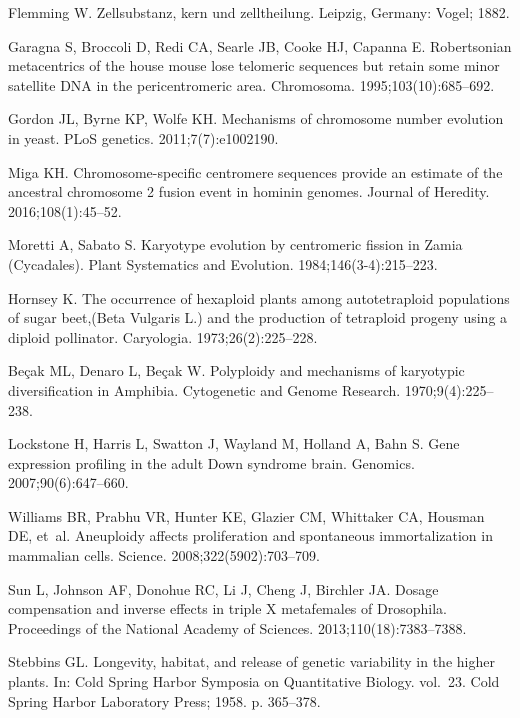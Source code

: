 \documentclass[]{rsos}%
\begin{document}
\begin{thebibliography}{9}

Flemming W. 
Zellsubstanz, kern und zelltheilung. Leipzig, Germany: Vogel; 1882.

Garagna S, Broccoli D, Redi CA, Searle JB, Cooke HJ, Capanna E.
 Robertsonian metacentrics of the house mouse lose telomeric sequences
  but retain some minor satellite DNA in the pericentromeric area.
 Chromosoma. 1995;103(10):685--692.

Gordon JL, Byrne KP, Wolfe KH.
 Mechanisms of chromosome number evolution in yeast.
 PLoS genetics. 2011;7(7):e1002190.

Miga KH.
 Chromosome-specific centromere sequences provide an estimate of the
  ancestral chromosome 2 fusion event in hominin genomes.
 Journal of Heredity. 2016;108(1):45--52.

Moretti A, Sabato S.
 Karyotype evolution by centromeric fission in Zamia (Cycadales).
 Plant Systematics and Evolution. 1984;146(3-4):215--223.

Hornsey K.
 The occurrence of hexaploid plants among autotetraploid populations
  of sugar beet,(Beta Vulgaris L.) and the production of tetraploid progeny
  using a diploid pollinator.
 Caryologia. 1973;26(2):225--228.

Be{\c{c}}ak ML, Denaro L, Be{\c{c}}ak W.
 Polyploidy and mechanisms of karyotypic diversification in Amphibia.
 Cytogenetic and Genome Research. 1970;9(4):225--238.

Lockstone H, Harris L, Swatton J, Wayland M, Holland A, Bahn S.
 Gene expression profiling in the adult Down syndrome brain.
 Genomics. 2007;90(6):647--660.

Williams BR, Prabhu VR, Hunter KE, Glazier CM, Whittaker CA, Housman DE, et~al.
 Aneuploidy affects proliferation and spontaneous immortalization in
  mammalian cells.
 Science. 2008;322(5902):703--709.

Sun L, Johnson AF, Donohue RC, Li J, Cheng J, Birchler JA.
 Dosage compensation and inverse effects in triple X metafemales of
  Drosophila.
 Proceedings of the National Academy of Sciences.
  2013;110(18):7383--7388.

Stebbins GL.
 Longevity, habitat, and release of genetic variability in the higher
  plants.
 In: Cold Spring Harbor Symposia on Quantitative Biology. vol.~23.
  Cold Spring Harbor Laboratory Press; 1958. p. 365--378.


\end{thebibliography}
\end{document}
